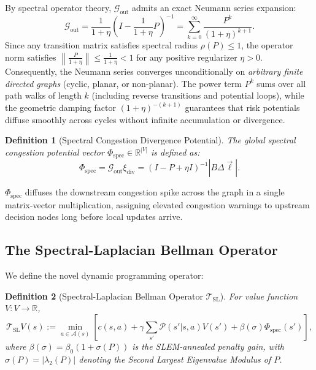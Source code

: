 \documentclass[11pt,a4paper]{article}
\newtheorem{definition}{Definition}
\begin{document}
By spectral operator theory, $\mathcal{G}_{\text{out}}$ admits an exact Neumann series expansion:
\begin{equation}
\label{eq:neumann_series}
\mathcal{G}_{\text{out}} = \frac{1}{1 + \eta} \left( I - \frac{1}{1 + \eta} P \right)^{-1} = \sum_{k=0}^{\infty} \frac{P^k}{(1 + \eta)^{k+1}}.
\end{equation}
Since any transition matrix satisfies spectral radius $\rho(P) \le 1$, the operator norm satisfies $\left\| \frac{P}{1 + \eta} \right\| \le \frac{1}{1 + \eta} < 1$ for any positive regularizer $\eta > 0$. Consequently, the Neumann series converges unconditionally on \textit{arbitrary finite directed graphs} (cyclic, planar, or non-planar). The power term $P^k$ sums over all path walks of length $k$ (including reverse transitions and potential loops), while the geometric damping factor $(1 + \eta)^{-(k+1)}$ guarantees that risk potentials diffuse smoothly across cycles without infinite accumulation or divergence.

\begin{definition}[Spectral Congestion Divergence Potential]
The global spectral congestion potential vector $\Phi_{\text{spec}} \in \mathbb{R}^{|V|}$ is defined as:
\begin{equation}
\Phi_{\text{spec}} = \mathcal{G}_{\text{out}} \xi_{\text{div}} = (I - P + \eta I)^{-1} |B \Delta \vec{\ell}|.
\end{equation}
\end{definition}

$\Phi_{\text{spec}}$ diffuses the downstream congestion spike across the graph in a single matrix-vector multiplication, assigning elevated congestion warnings to upstream decision nodes long before local updates arrive.

\subsection{The Spectral-Laplacian Bellman Operator}
We define the novel dynamic programming operator:
\begin{definition}[Spectral-Laplacian Bellman Operator $\mathcal{T}_{\text{SL}}$]
For value function $V: V \to \mathbb{R}$,
\begin{equation}
\mathcal{T}_{\text{SL}} V(s) := \min_{a \in \mathcal{A}(s)} \left[ c(s, a) + \gamma \sum_{s'} \mathcal{P}(s'|s, a) V(s') + \beta(\sigma) \Phi_{\text{spec}}(s') \right],
\end{equation}
where $\beta(\sigma) = \beta_0 (1 + \sigma(P))$ is the SLEM-annealed penalty gain, with $\sigma(P) = |\lambda_2(P)|$ denoting the Second Largest Eigenvalue Modulus of $P$.
\end{definition}
\end{document}
